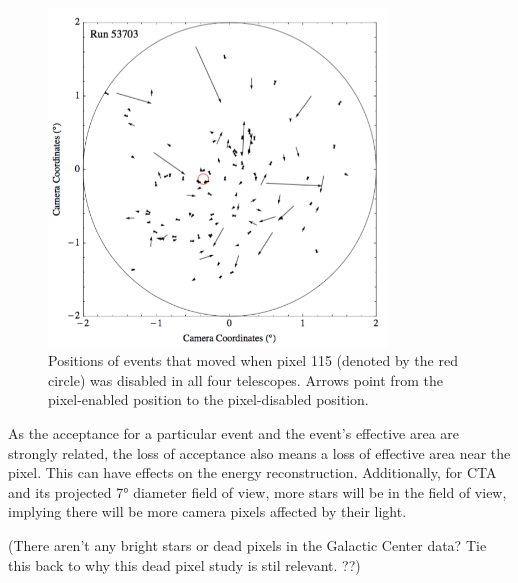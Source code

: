     \begin{figure}[ht]
      \centering
      \includegraphics[width=0.8\textwidth]{images/disabled_pixel/moving_events}
      \caption[Event Movement After Disabling Camera Pixels]{
        Positions of events that moved when pixel 115 (denoted by the red circle) was disabled in all four telescopes.  
        Arrows point from the pixel-enabled position to the pixel-disabled position.
      }
      \label{fig:dpix_move}
    \end{figure}

    As the acceptance for a particular event and the event's effective area are strongly related, the loss of acceptance also means a loss of effective area near the pixel.
    This can have effects on the energy reconstruction.
    Additionally, for CTA and its projected \ang{7} diameter field of view, more stars will be in the field of view, implying there will be more camera pixels affected by their light.
    
    {\color{red}(There aren't any bright stars or dead pixels in the Galactic Center data? Tie this back to why this dead pixel study is stil relevant. ??)}
    
